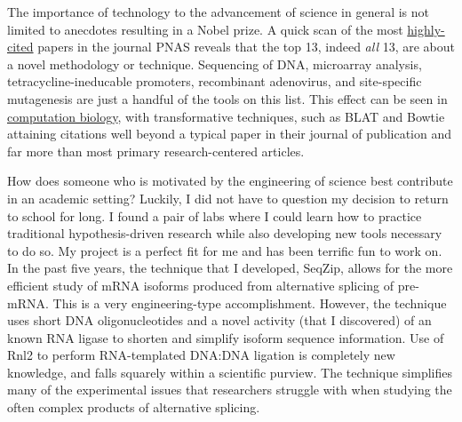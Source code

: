 The importance of technology to the advancement of science in general is not limited to anecdotes resulting in a Nobel prize. A quick scan of the most \href{http://www.pnas.org/reports/most-cited}{highly-cited} papers in the journal PNAS reveals that the top 13, indeed \textit{all} 13, are about a novel methodology or technique. Sequencing of DNA, microarray analysis, tetracycline-ineducable promoters, recombinant adenovirus, and site-specific mutagenesis are just a handful of the tools on this list. This effect can be seen in \href{http://simplystatistics.org/2014/04/07/writing-good-software-can-have-more-impact-than-publishing-in-high-impact-journals-for-genomic-statisticians/}{computation biology}, with transformative techniques, such as BLAT \citep{Altschul1990} and Bowtie \citep{Langmead2009} attaining citations well beyond a typical paper in their journal of publication and far more than most primary research-centered articles.

How does someone who is motivated by the engineering of science best contribute in an academic setting? Luckily, I did not have to question my decision to return to school for long. I found a pair of labs where I could learn how to practice traditional hypothesis-driven research while also developing new tools necessary to do so. My project is a perfect fit for me and has been terrific fun to work on. In the past five years, the technique that I developed, SeqZip, allows for the more efficient study of  mRNA isoforms produced from alternative splicing of pre-mRNA. This is a very engineering-type accomplishment. However, the technique uses short DNA oligonucleotides and a novel activity (that I discovered) of an known RNA ligase to shorten and simplify isoform sequence information. Use of Rnl2 to perform RNA-templated DNA:DNA ligation is completely new knowledge, and falls squarely within a scientific purview. The technique simplifies many of the experimental issues that researchers struggle with when studying the often complex products of alternative splicing.

